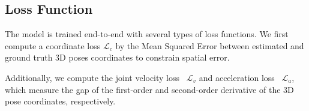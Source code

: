 \documentclass{article}
\begin{document}
\subsection{Loss Function}The model is trained end-to-end with several types of loss functions. We first compute a coordinate loss $\mathcal L_c$ by the Mean Squared Error between estimated and ground truth 3D poses coordinates to constrain spatial error.
\iffalse
\begin{equation}\label{mse}
    \mathcal L_c = \frac{1}{N\cdot J}\sum_n\sum_j \|Y_{n,i}^{3d} - X_{n,i}^{3d}\|_2,
\end{equation}
where $Y^{3d}\in\mathbb R^{N\times J\times 3}$ is the ground-truth 3d coordinates. 
\fi
Additionally, we compute the joint velocity loss~\cite{pavllo20193d} $\mathcal L_v$ and acceleration loss~\cite{xu20213d} $\mathcal L_a$, which measure the gap of the first-order and second-order derivative of the 3D pose coordinates, respectively. 
\iffalse
Thus the temporal loss is $\mathcal L_t = \lambda_v\cdot\mathcal L_v + \lambda_a\cdot\mathcal L_a$:
\begin{equation}
    \mathcal L_v = \frac{1}{(N-1)\cdot J}\sum\nolimits_{n=1}^{N-1}\sum\nolimits_{j=1}^J \|V_j^n - \hat V_j^n\|_2,
\end{equation}
\begin{equation}
    \mathcal L_a = \frac{1}{(N-2)\cdot J}\sum\nolimits_{n=1}^{N-2}\sum\nolimits_{j=1}^J \|A_j^n - \hat A_j^n\|_2,
\end{equation}
where $\lambda_v$ and $\lambda_a$ are corresponding weights. $V_j^n$ denotes the difference at joint $j$ between frame $n$ and $n+1$ of the ground truth. $A_j^n$ is the difference between $V_j^n$ and $V_j^{n+1}$. $\hat V_j^n$ and $\hat A_j^n$ are the same with above for estimated poses.
\fi
\end{document}
